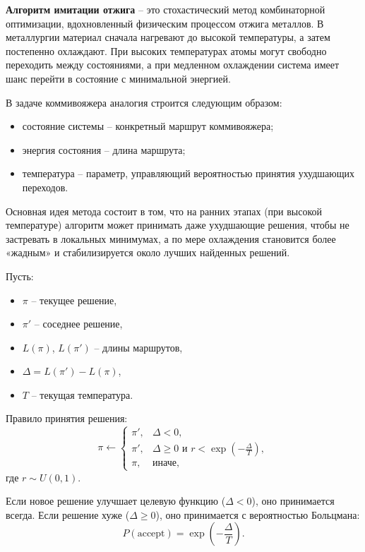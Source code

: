 \documentclass[12pt,a4paper]{article}
\begin{document}
\textbf{Алгоритм имитации отжига} -- это стохастический метод комбинаторной оптимизации,
вдохновленный физическим процессом отжига металлов. В металлургии материал сначала
нагревают до высокой температуры, а затем постепенно охлаждают. При высоких температурах
атомы могут свободно переходить между состояниями, а при медленном охлаждении система
имеет шанс перейти в состояние с минимальной энергией.

В задаче коммивояжера аналогия строится следующим образом:
\begin{itemize}
    \item состояние системы -- конкретный маршрут коммивояжера;
    \item энергия состояния -- длина маршрута;
    \item температура -- параметр, управляющий вероятностью принятия ухудшающих переходов.
\end{itemize}

Основная идея метода состоит в том, что на ранних этапах (при высокой температуре)
алгоритм может принимать даже ухудшающие решения, чтобы не застревать в локальных
минимумах, а по мере охлаждения становится более «жадным» и стабилизируется около
лучших найденных решений.

Пусть:
\begin{itemize}
    \item $\pi$ -- текущее решение,
    \item $\pi'$ -- соседнее решение,
    \item $L(\pi)$, $L(\pi')$ -- длины маршрутов,
    \item $\Delta = L(\pi') - L(\pi)$,
    \item $T$ -- текущая температура.
\end{itemize}

Правило принятия решения:
\begin{equation}
\pi \leftarrow
\begin{cases}
\pi', & \Delta < 0, \\
\pi', & \Delta \ge 0 \text{ и } r < \exp\left(-\frac{\Delta}{T}\right), \\
\pi, & \text{иначе},
\end{cases}
\end{equation}
где $r \sim U(0,1)$.

Если новое решение улучшает целевую функцию ($\Delta < 0$), оно принимается всегда.
Если решение хуже ($\Delta \ge 0$), оно принимается с вероятностью Больцмана:
\begin{equation}
P(\text{accept}) = \exp\left(-\frac{\Delta}{T}\right).
\end{equation}
\end{document}
